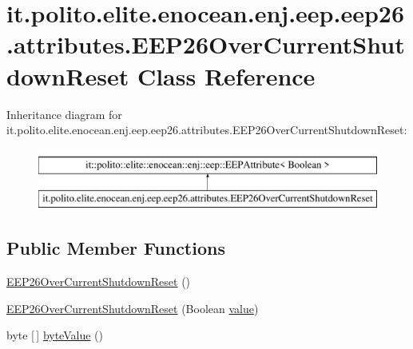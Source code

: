 \hypertarget{classit_1_1polito_1_1elite_1_1enocean_1_1enj_1_1eep_1_1eep26_1_1attributes_1_1_e_e_p26_over_current_shutdown_reset}{}\section{it.\+polito.\+elite.\+enocean.\+enj.\+eep.\+eep26.\+attributes.\+E\+E\+P26\+Over\+Current\+Shutdown\+Reset Class Reference}
\label{classit_1_1polito_1_1elite_1_1enocean_1_1enj_1_1eep_1_1eep26_1_1attributes_1_1_e_e_p26_over_current_shutdown_reset}
Inheritance diagram for it.\+polito.\+elite.\+enocean.\+enj.\+eep.\+eep26.\+attributes.\+E\+E\+P26\+Over\+Current\+Shutdown\+Reset\+:\begin{figure}[H]
\begin{center}
\leavevmode
\includegraphics[height=2.000000cm]{classit_1_1polito_1_1elite_1_1enocean_1_1enj_1_1eep_1_1eep26_1_1attributes_1_1_e_e_p26_over_current_shutdown_reset}
\end{center}
\end{figure}
\subsection*{Public Member Functions}
\begin{DoxyCompactItemize}
\item 
\hyperlink{classit_1_1polito_1_1elite_1_1enocean_1_1enj_1_1eep_1_1eep26_1_1attributes_1_1_e_e_p26_over_current_shutdown_reset_a94bd725eee1517b14c3a79fc486f8dd6}{E\+E\+P26\+Over\+Current\+Shutdown\+Reset} ()
\item 
\hyperlink{classit_1_1polito_1_1elite_1_1enocean_1_1enj_1_1eep_1_1eep26_1_1attributes_1_1_e_e_p26_over_current_shutdown_reset_a711bacdaae4a654b9a4aa77e904dd086}{E\+E\+P26\+Over\+Current\+Shutdown\+Reset} (Boolean \hyperlink{classit_1_1polito_1_1elite_1_1enocean_1_1enj_1_1eep_1_1_e_e_p_attribute_af4d7e34642004bb6ccfae51e925c983d}{value})
\item 
byte \mbox{[}$\,$\mbox{]} \hyperlink{classit_1_1polito_1_1elite_1_1enocean_1_1enj_1_1eep_1_1eep26_1_1attributes_1_1_e_e_p26_over_current_shutdown_reset_a8b5229275f3dffed9703dddfdbb00403}{byte\+Value} ()
\end{DoxyCompactItemize}
